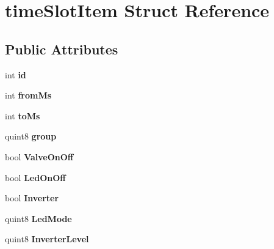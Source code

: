 \hypertarget{structtime_slot_item}{}\section{time\+Slot\+Item Struct Reference}
\label{structtime_slot_item}
\subsection*{Public Attributes}
\begin{DoxyCompactItemize}
\item 
\mbox{\label{structtime_slot_item_ab430dbd2e7c46c9bd87554d8e3bbaf64}} 
int {\bfseries id}
\item 
\mbox{\label{structtime_slot_item_aadbe53740fe10b76311f689694089b1f}} 
int {\bfseries from\+Ms}
\item 
\mbox{\label{structtime_slot_item_a4b74d22205b5f6c22e6d0f18f2c42d6e}} 
int {\bfseries to\+Ms}
\item 
\mbox{\label{structtime_slot_item_ab5b1e73d9a3dba3e043d23ad807653e6}} 
quint8 {\bfseries group}
\item 
\mbox{\label{structtime_slot_item_a4f805f461449412752fbebc567e6bcca}} 
bool {\bfseries Valve\+On\+Off}
\item 
\mbox{\label{structtime_slot_item_ae5237412d9e862b0b9b98b55c6617dd7}} 
bool {\bfseries Led\+On\+Off}
\item 
\mbox{\label{structtime_slot_item_a6a3286dc5c1dfa1af679f1ab550a0e3a}} 
bool {\bfseries Inverter}
\item 
\mbox{\label{structtime_slot_item_af23116ebe70f2174eb22eb18a667ff1b}} 
quint8 {\bfseries Led\+Mode}
\item 
\mbox{\label{structtime_slot_item_a50752f5574513d60caf9c19e4cb3d71b}} 
quint8 {\bfseries Inverter\+Level}
\item 
\mbox{\label{structtime_slot_item_a6d29e12d908b61c958164feabeb2f7f3}} 

\end{DoxyCompactItemize}
